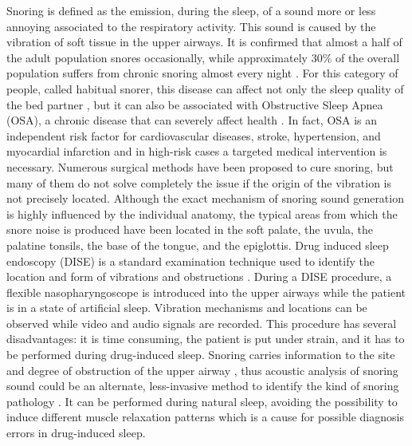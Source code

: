 Snoring is defined as the emission, during the sleep, of a sound more or less annoying associated to the respiratory activity. This sound is caused by the vibration of soft tissue in the upper airways. It is confirmed that almost a half of the adult population snores occasionally, while approximately 30\% of the overall population suffers from chronic snoring almost every night \cite{young1997nasal}.
For this category of people, called habitual snorer, this disease can affect not only the sleep quality of the bed partner \cite{blumen2012snoring}, but it can also be associated with Obstructive Sleep Apnea (OSA), a chronic disease that can severely affect health \cite{strollo1996obstructive}. 
In fact, OSA  is an independent risk factor for cardiovascular diseases, stroke, hypertension, and myocardial infarction and in high-risk cases  a targeted medical intervention is necessary. Numerous surgical methods have been proposed to cure snoring, but many of them do not solve completely the issue if the origin of the vibration is not precisely located.
Although the exact mechanism of snoring sound generation is highly influenced by the individual anatomy, the typical areas from which the snore noise is produced have been located in the soft palate, the uvula, the palatine tonsils, the base of the tongue, and the epiglottis.
Drug induced sleep endoscopy (DISE) is a standard examination technique used to identify the location and form of vibrations and obstructions \cite{el2003predictive}. During a DISE procedure, a flexible nasopharyngoscope is introduced into the upper airways while the patient is in a state of artificial sleep. Vibration mechanisms and locations can be observed while video and audio signals are recorded. This procedure has several disadvantages: it is time consuming, the patient is put under strain, and it has to be performed during drug-induced sleep. 
Snoring carries information to the site and degree of obstruction of the upper airway \cite{pevernagie2010acoustics}, thus acoustic analysis of snoring sound could be an alternate, less-invasive method to identify the kind of snoring pathology \cite{schmitt2016bag}. It can be performed during natural sleep, avoiding the possibility to induce different muscle relaxation patterns which is a cause for possible diagnosis errors in drug-induced sleep.


